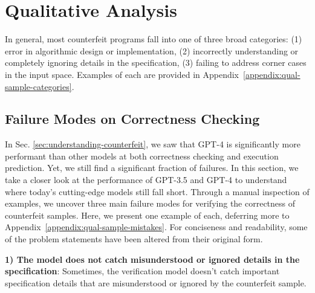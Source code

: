 \section{Qualitative Analysis} \label{sec:qual-analysis}
In general, most counterfeit programs fall into one of three broad categories: (1) error in algorithmic design or implementation, (2) incorrectly understanding or completely ignoring details in the specification, (3) failing to address corner cases in the input space. Examples of each are provided in Appendix~\ref{appendix:qual-sample-categories}.

\subsection{Failure Modes on Correctness Checking}
In Sec. \ref{sec:understanding-counterfeit}, we saw that GPT-4 is significantly more performant than other models at both correctness checking and execution prediction. Yet, we still find a significant fraction of failures. In this section, we take a closer look at the performance of GPT-3.5 and GPT-4 to understand where today's cutting-edge models still fall short. Through a manual inspection of examples, we uncover three main failure modes for verifying the correctness of counterfeit samples. Here, we present one example of each, deferring more to Appendix~\ref{appendix:qual-sample-mistakes}. For conciseness and readability, some of the problem statements have been altered from their original form.


\textbf{1) The model does not catch misunderstood or ignored details in the specification}: Sometimes, the verification model doesn't catch important specification details that are misunderstood or ignored by the counterfeit sample. 



